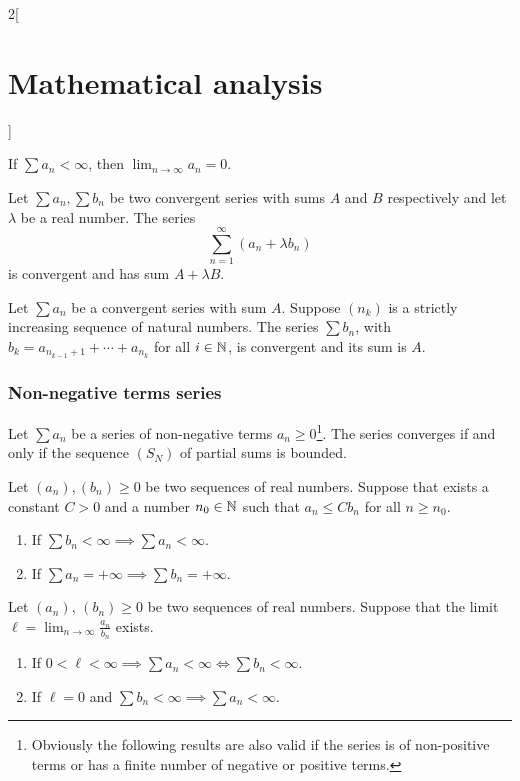 \documentclass[../../../main.tex]{subfiles}
\begin{document}
\begin{multicols}{2}[\section{Mathematical analysis}]
\begin{corollary}
    If $\sum a_n<\infty$, then $\displaystyle\lim_{n\to \infty} a_n=0$.
  \end{corollary}
  \begin{theorem}[Linearity]
    Let $\sum a_n,\sum b_n$ be two convergent series with sums $A$ and $B$ respectively and let $\lambda$ be a real number. The series $$\sum_{n=1}^\infty (a_n+\lambda b_n)$$ is convergent and has sum $A+\lambda B$.
  \end{theorem}
  \begin{theorem}
    Let $\sum a_n$ be a convergent series with sum $A$. Suppose $(n_k)$ is a strictly increasing sequence of natural numbers. The series $\sum b_n$, with $b_k=a_{n_{k-1}+1}+\cdots+a_{n_k}$ for all $i\in\mathbb{N} $, is convergent and its sum is $A$.
  \end{theorem}
  \subsubsection{Non-negative terms series}
  \begin{theorem}
    Let $\sum a_n$ be a series of non-negative terms $a_n\geq 0$\footnote{Obviously the following results are also valid if the series is of non-positive terms or has a finite number of negative or positive terms.}. The series converges if and only if the sequence $(S_N)$ of partial sums is bounded.
  \end{theorem}
  \begin{theorem}
    Let $(a_n),(b_n)\geq 0$ be two sequences of real numbers. Suppose that exists a constant $C>0$ and a number $n_0\in\mathbb{N} $ such that $a_n\leq Cb_n$ for all $n\geq n_0$.
    \begin{enumerate}
      \item If $\sum b_n<\infty\implies\sum a_n<\infty$.
      \item If $\sum a_n=+\infty\implies\sum b_n=+\infty$.
    \end{enumerate}
  \end{theorem}
  \begin{theorem}
    Let $(a_n)$, $(b_n)\geq 0$ be two sequences of real numbers. Suppose that the limit $\ell=\displaystyle\lim_{n\to\infty}\frac{a_n}{b_n}$ exists.
    \begin{enumerate}
      \item If $0<\ell<\infty\implies\sum a_n<\infty\iff\sum b_n<\infty$.
      \item If $\ell=0$ and $\sum b_n<\infty\implies\sum a_n<\infty$.

\end{enumerate}
\end{theorem}
\end{multicols}
\end{document}
